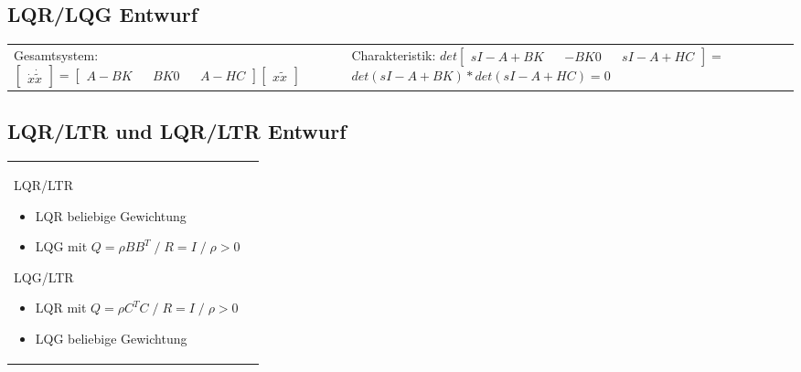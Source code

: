 \subsection{LQR/LQG Entwurf}
\begin{tabular}{ll}
	\parbox{6cm}{Gesamtsystem: \\ $
			\begin{bmatrix}
				\dot{x}\\
				\dot{\tilde{x}}\\
			\end{bmatrix} = 
			\begin{bmatrix}
				A-BK && BK\\
				0 && A-HC\\
			\end{bmatrix} 
			\begin{bmatrix}
				x\\
				\tilde{x}\\
			\end{bmatrix}
			$} &
	\parbox{6cm}{Charakteristik:\\ $
			det 
			\begin{bmatrix}
				sI - A + BK && -BK\\
				0 && sI - A + HC\\
			\end{bmatrix}=$\\
			$det(sI-A+BK)*det(sI-A+HC)=0$}
\end{tabular}
	
\subsection{LQR/LTR und LQR/LTR Entwurf}

\begin{tabular}{ll}
	\parbox{8cm}{
		LQR/LTR
		\begin{itemize}
			\item LQR beliebige Gewichtung
			\item LQG mit $Q=\rho BB^T \; / \; R=I  \; / \; \rho > 0$
		\end{itemize}}
	\parbox{8cm}{
			LQG/LTR
			\begin{itemize}
				\item LQR mit $Q=\rho C^TC \; / \; R=I  \; / \; \rho > 0$
				\item LQG beliebige Gewichtung
			\end{itemize}}
\end{tabular}		
